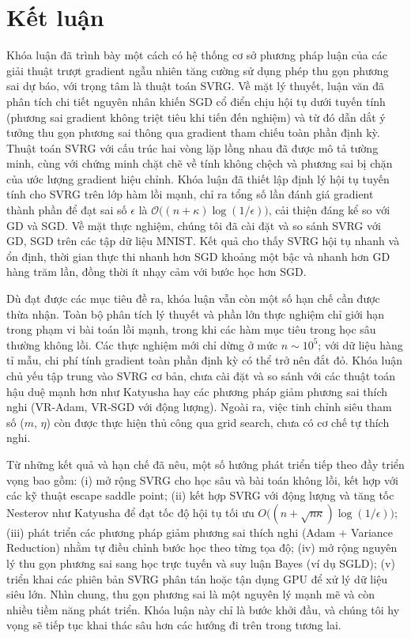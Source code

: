 \chapter*{Kết luận}
\label{chap:conclusion}

Khóa luận đã trình bày một cách có hệ thống cơ sở phương pháp luận của các giải thuật trượt gradient ngẫu nhiên tăng cường sử dụng phép thu gọn phương sai dự báo, với trọng tâm là thuật toán SVRG. Về mặt lý thuyết, luận văn đã phân tích chi tiết nguyên nhân khiến SGD cổ điển chịu hội tụ dưới tuyến tính (phương sai gradient không triệt tiêu khi tiến đến nghiệm) và từ đó dẫn dắt ý tưởng thu gọn phương sai thông qua gradient tham chiếu toàn phần định kỳ. Thuật toán SVRG với cấu trúc hai vòng lặp lồng nhau đã được mô tả tường minh, cùng với chứng minh chặt chẽ về tính không chệch và phương sai bị chặn của ước lượng gradient hiệu chỉnh. Khóa luận đã thiết lập định lý hội tụ tuyến tính cho SVRG trên lớp hàm lồi mạnh, chỉ ra tổng số lần đánh giá gradient thành phần để đạt sai số $\epsilon$ là $\mathcal{O}\bigl((n + \kappa)\log(1/\epsilon)\bigr)$, cải thiện đáng kể so với GD và SGD. Về mặt thực nghiệm, chúng tôi đã cài đặt và so sánh SVRG với GD, SGD trên các tập dữ liệu MNIST. Kết quả cho thấy SVRG hội tụ nhanh và ổn định, thời gian thực thi nhanh hơn SGD khoảng một bậc và nhanh hơn GD hàng trăm lần, đồng thời ít nhạy cảm với bước học hơn SGD.

Dù đạt được các mục tiêu đề ra, khóa luận vẫn còn một số hạn chế cần được thừa nhận. Toàn bộ phân tích lý thuyết và phần lớn thực nghiệm chỉ giới hạn trong phạm vi bài toán lồi mạnh, trong khi các hàm mục tiêu trong học sâu thường không lồi. Các thực nghiệm mới chỉ dừng ở mức $n \sim 10^5$; với dữ liệu hàng tỉ mẫu, chi phí tính gradient toàn phần định kỳ có thể trở nên đắt đỏ. Khóa luận chủ yếu tập trung vào SVRG cơ bản, chưa cài đặt và so sánh với các thuật toán hậu duệ mạnh hơn như Katyusha \citep{allen2017katyusha} hay các phương pháp giảm phương sai thích nghi (VR‑Adam, VR‑SGD với động lượng). Ngoài ra, việc tinh chỉnh siêu tham số ($m$, $\eta$) còn được thực hiện thủ công qua grid search, chưa có cơ chế tự thích nghi.

Từ những kết quả và hạn chế đã nêu, một số hướng phát triển tiếp theo đầy triển vọng bao gồm: (i) mở rộng SVRG cho học sâu và bài toán không lồi, kết hợp với các kỹ thuật escape saddle point; (ii) kết hợp SVRG với động lượng và tăng tốc Nesterov như Katyusha \citep{allen2017katyusha} để đạt tốc độ hội tụ tối ưu $O\bigl((n + \sqrt{n\kappa})\log(1/\epsilon)\bigr)$; (iii) phát triển các phương pháp giảm phương sai thích nghi (Adam + Variance Reduction) nhằm tự điều chỉnh bước học theo từng tọa độ; (iv) mở rộng nguyên lý thu gọn phương sai sang học trực tuyến và suy luận Bayes (ví dụ SGLD); (v) triển khai các phiên bản SVRG phân tán hoặc tận dụng GPU để xử lý dữ liệu siêu lớn. Nhìn chung, thu gọn phương sai là một nguyên lý mạnh mẽ và còn nhiều tiềm năng phát triển. Khóa luận này chỉ là bước khởi đầu, và chúng tôi hy vọng sẽ tiếp tục khai thác sâu hơn các hướng đi trên trong tương lai.